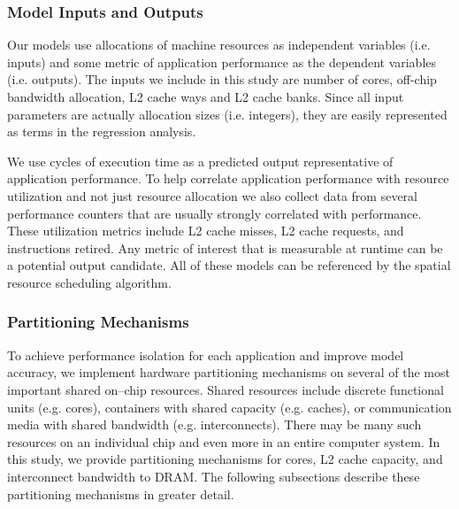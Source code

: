 \subsubsection*{Model Inputs and Outputs}
Our models use allocations of machine resources as independent variables (i.e. inputs) and some metric of application performance as the dependent variables (i.e. outputs).  The inputs we include in this study are number of cores, off-chip bandwidth allocation, L2 cache ways and L2 cache banks.  Since all input parameters are actually allocation sizes (i.e. integers), they are easily represented as terms in the regression analysis.

We use cycles of execution time as a predicted output representative of application performance.  To help correlate application performance with resource utilization and not just resource allocation we also collect data from several performance counters that are usually strongly correlated with performance. These utilization metrics include L2 cache misses, L2 cache requests, and instructions retired. Any metric of interest that is measurable at runtime can be a potential output candidate. All of these models can be referenced by the spatial resource scheduling algorithm.


\subsubsection{Partitioning Mechanisms}
To achieve performance isolation for each application and improve model accuracy, we implement hardware partitioning mechanisms on several of the most important shared on--chip  resources. Shared resources include discrete functional units (e.g. cores), containers with shared capacity (e.g. caches), or communication media with shared bandwidth (e.g. interconnects).  There may be many such resources on an individual chip and even more in an entire computer system. In this study, we provide partitioning mechanisms for cores, L2 cache capacity, and interconnect bandwidth to DRAM.
 The following subsections describe these partitioning mechanisms in greater detail.

